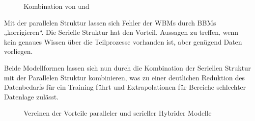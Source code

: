 \begin{figure}[htbp]
    \centering
    \caption{\label{fig-hybrid}Kombination von  und }
\end{figure}

Mit der parallelen Struktur lassen sich Fehler der \glspl{WBM} durch \glspl{BBM} „korrigieren“. Die Serielle Struktur hat den Vorteil, Aussagen zu treffen, wenn kein genaues Wissen über die Teilprozesse vorhanden ist, aber genügend Daten vorliegen. 

Beide Modellformen lassen sich nun durch die Kombination der Seriellen Struktur mit der Parallelen Struktur kombinieren, was zu einer deutlichen Reduktion des Datenbedarfs für ein Training führt und Extrapolationen für Bereiche schlechter Datenlage zulässt. 

\begin{figure}[htbp]
    \centering
    \caption{\label{fig-hybrid-mashed}Vereinen der Vorteile paralleler und serieller Hybrider Modelle}
\end{figure}

